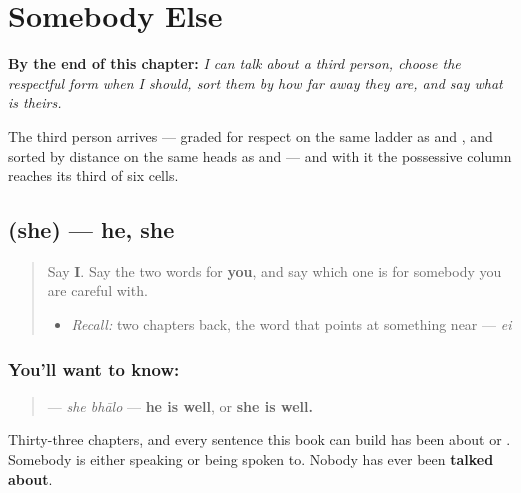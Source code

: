 
\chapter{Somebody Else}
\label{ch:bn-somebody-else}

\begin{chapteropening}
\textbf{By the end of this chapter:} \emph{I can talk about a third person, choose the respectful form when I should, sort them by how far away they are, and say what is theirs.}

The third person arrives — graded for respect on the same ladder as  and , and sorted by distance on the same heads as  and  — and with it the possessive column reaches its third of six cells.
\end{chapteropening}

\section[\texorpdfstring{\bn{সে} (she)}{সে (she)}]{ (she) — he, she}

\label{lesson:BN-C23-she}



\begin{quote}
Say \textbf{I}. Say the two words for \textbf{you}, and say which one is for somebody you are careful with.

\begin{itemize}
\raggedright
  \item \emph{Recall:} two chapters back, the word that points at something near — \emph{ei}
\end{itemize}
\end{quote}

\subsection*{You'll want to know: }
\begin{quote}
\textbf{ } — \emph{she bhālo} — \textbf{he is well}, or \textbf{she is well.}
\end{quote}

Thirty-three chapters, and every sentence this book can build has been about \textbf{} or \textbf{}. Somebody is either speaking or being spoken to. Nobody has ever been \textbf{talked about}.

